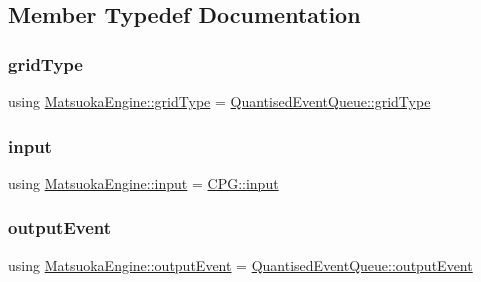 \subsection{Member Typedef Documentation}
\mbox{\label{classMatsuokaEngine_aaf41ce5bf63099a1d864e4eb91527cb5}} 
\subsubsection{\texorpdfstring{grid\+Type}{gridType}}
{\footnotesize\ttfamily using \mbox{\hyperlink{classQuantisedEventQueue_ae186d50bd503038452edbbdd0c7c259e}{Matsuoka\+Engine\+::grid\+Type}} =  \mbox{\hyperlink{classQuantisedEventQueue_ae186d50bd503038452edbbdd0c7c259e}{Quantised\+Event\+Queue\+::grid\+Type}}}

\mbox{\label{classMatsuokaEngine_a811a5449f07004a2eb6b34e8c9bd862f}} 
\subsubsection{\texorpdfstring{input}{input}}
{\footnotesize\ttfamily using \mbox{\hyperlink{classMatsuokaEngine_a811a5449f07004a2eb6b34e8c9bd862f}{Matsuoka\+Engine\+::input}} =  \mbox{\hyperlink{structCPG_1_1input}{C\+P\+G\+::input}}}

\mbox{\label{classMatsuokaEngine_a09035e4918ce82c9378821c88375f843}} 
\subsubsection{\texorpdfstring{output\+Event}{outputEvent}}
{\footnotesize\ttfamily using \mbox{\hyperlink{classMatsuokaEngine_a09035e4918ce82c9378821c88375f843}{Matsuoka\+Engine\+::output\+Event}} =  \mbox{\hyperlink{structQuantisedEventQueue_1_1outputEvent}{Quantised\+Event\+Queue\+::output\+Event}}}

\mbox{\label{classMatsuokaEngine_acbf2fcb6ddd3b8edc414753248b95fc2}} 
